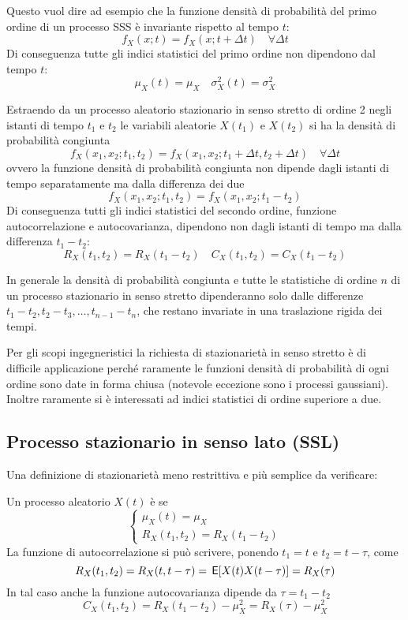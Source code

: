 Questo vuol dire ad esempio che la funzione densità di probabilità del primo ordine di un processo SSS è invariante rispetto al tempo $t$:
\[f_X(x;t)=f_X(x;t+\Delta t)\quad\forall\Delta t\]
Di conseguenza tutte gli indici statistici del primo ordine non dipendono dal tempo $t$:
\[\mu_X(t)=\mu_X\quad \sigma^2_X(t)=\sigma^2_X\]

Estraendo da un processo aleatorio stazionario in senso stretto di ordine 2 negli istanti di tempo $t_1$ e $t_2$ le variabili aleatorie $X(t_1)$ e $X(t_2)$ si ha la densità di probabilità congiunta
\[f_X(x_1,x_2;t_1,t_2)=f_X(x_1,x_2;t_1+\Delta t,t_2+\Delta t)\quad\forall\Delta t\]
ovvero la funzione densità di probabilità congiunta non dipende dagli istanti di tempo separatamente ma dalla differenza dei due
\begin{equation}
f_X(x_1,x_2;t_1,t_2)=f_X(x_1,x_2;t_1-t_2)
\end{equation}
Di conseguenza tutti gli indici statistici del secondo ordine, funzione autocorrelazione e autocovarianza, dipendono non dagli istanti di tempo ma dalla differenza $t_1-t_2$:
\[R_X(t_1,t_2)=R_X(t_1-t_2)\quad C_X(t_1,t_2)=C_X(t_1-t_2)\]

In generale la densità di probabilità congiunta e tutte le statistiche di ordine $n$ di un processo stazionario in senso stretto dipenderanno solo dalle differenze $t_1-t_2, t_2-t_3, \dots, t_{n-1}-t_n$, che restano invariate in una traslazione rigida dei tempi.

\begin{nota}Per gli scopi ingegneristici la richiesta di stazionarietà in senso stretto è di difficile applicazione perché raramente le funzioni densità di probabilità di ogni ordine sono date in forma chiusa (notevole eccezione sono i processi gaussiani). Inoltre raramente si è interessati ad indici statistici di ordine superiore a due.
\end{nota}

\subsection{Processo stazionario in senso lato (SSL)}
Una definizione di stazionarietà meno restrittiva e più semplice da verificare:

Un processo aleatorio $X(t)$ è  se
\begin{equation}\label{eq:processo_stazionario_senso_lato}
\begin{cases}
\mu_X(t)=\mu_X\\
R_X(t_1,t_2)=R_X(t_1-t_2)
\end{cases}
\end{equation}
La funzione di autocorrelazione si può scrivere, ponendo $t_1=t$ e $t_2=t-\tau$, come \begin{equation}R_X(t_1,t_2)=R_X(t,t-\tau)=\,{\operatorname{\mathsf{E}}}\!\left[{X(t)X(t-\tau)}\right]=R_X(\tau)\end{equation}
In tal caso anche la funzione autocovarianza dipende da $\tau=t_1-t_2$
\begin{equation}C_X(t_1,t_2)=R_X(t_1-t_2)-\mu^2_X=R_X(\tau)-\mu^2_X\end{equation}

